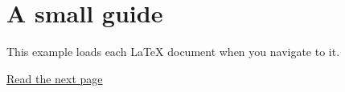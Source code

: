 \usepackage{hyperref}
\section*{A small guide}
This example loads each LaTeX document when you navigate to it.

\href{chapter.tex}{Read the next page}
